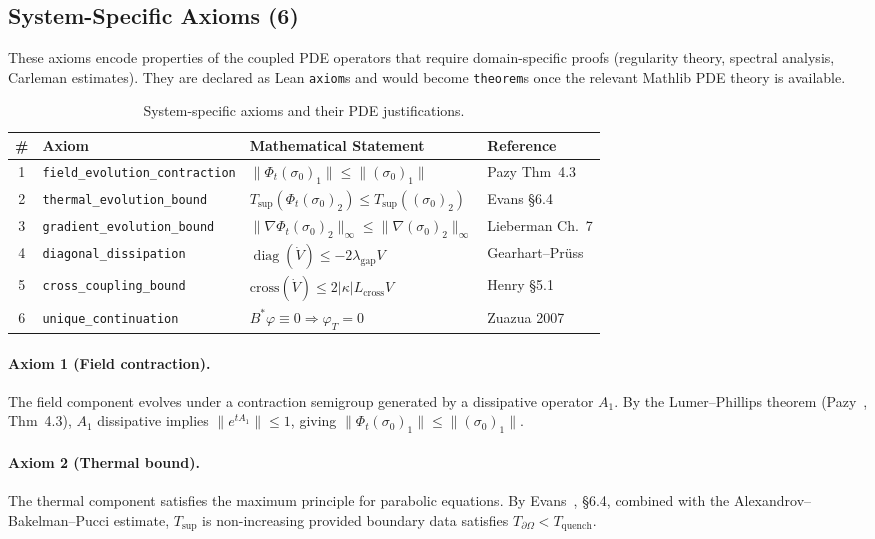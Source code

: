\documentclass[11pt,a4paper]{article}
\theoremstyle{plain}
\theoremstyle{definition}
\theoremstyle{remark}
\newcommand{\norm}[1]{\lVert #1 \rVert}
\newcommand{\abs}[1]{\lvert #1 \rvert}
\newcommand{\kk}{\kappa}
\newcommand{\leaninline}[1]{\texttt{#1}}
\DeclareMathOperator{\diag}{diag}
\begin{document}
\subsection{System-Specific Axioms (6)}

These axioms encode properties of the coupled PDE operators that require
domain-specific proofs (regularity theory, spectral analysis, Carleman
estimates).  They are declared as Lean \texttt{axiom}s and would become
\texttt{theorem}s once the relevant Mathlib PDE theory is available.

\begin{table}[ht]
\centering
\caption{System-specific axioms and their PDE justifications.}
\label{tab:sys-axioms}
\begin{tabularx}{\textwidth}{clXl}
\toprule
\# & Axiom & Mathematical Statement & Reference \\
\midrule
1 & \leaninline{field\_evolution\_contraction}
  & $\norm{\Phi_t(\sigma_0)_1} \le \norm{(\sigma_0)_1}$
  & Pazy Thm~4.3 \\
2 & \leaninline{thermal\_evolution\_bound}
  & $T_{\sup}(\Phi_t(\sigma_0)_2) \le T_{\sup}((\sigma_0)_2)$
  & Evans \S6.4 \\
3 & \leaninline{gradient\_evolution\_bound}
  & $\norm{\nabla \Phi_t(\sigma_0)_2}_\infty \le \norm{\nabla(\sigma_0)_2}_\infty$
  & Lieberman Ch.~7 \\
4 & \leaninline{diagonal\_dissipation}
  & $\diag(\dot{V}) \le -2\lambda_{\mathrm{gap}} V$
  & Gearhart--Pr\"{u}ss \\
5 & \leaninline{cross\_coupling\_bound}
  & $\mathrm{cross}(\dot{V}) \le 2\abs{\kk} L_{\mathrm{cross}} V$
  & Henry \S5.1 \\
6 & \leaninline{unique\_continuation}
  & $B^*\varphi \equiv 0 \Rightarrow \varphi_T = 0$
  & Zuazua 2007 \\
\bottomrule
\end{tabularx}
\end{table}

\paragraph{Axiom 1 (Field contraction).}
The field component evolves under a contraction semigroup generated by a
dissipative operator $A_1$.  By the Lumer--Phillips theorem
(Pazy~\cite{Pazy1983}, Thm~4.3), $A_1$ dissipative implies
$\norm{e^{tA_1}} \le 1$, giving $\norm{\Phi_t(\sigma_0)_1} \le
\norm{(\sigma_0)_1}$.

\paragraph{Axiom 2 (Thermal bound).}
The thermal component satisfies the maximum principle for parabolic
equations.  By Evans~\cite{Evans2010}, \S6.4, combined with the
Alexandrov--Bakelman--Pucci estimate, $T_{\sup}$ is non-increasing
provided boundary data satisfies $T_{\partial\Omega} < T_{\mathrm{quench}}$.
\end{document}

